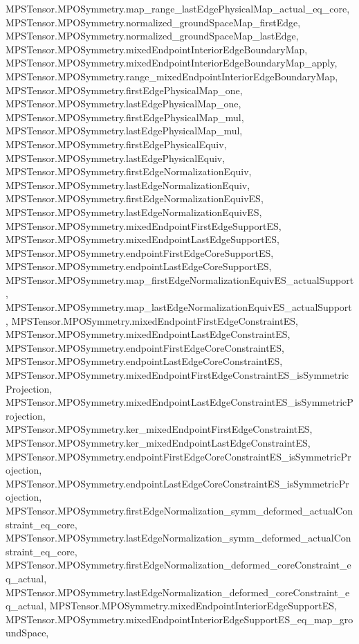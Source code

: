 \begin{lemma}
{        MPSTensor.MPOSymmetry.map_range_lastEdgePhysicalMap_actual_eq_core,
        MPSTensor.MPOSymmetry.normalized_groundSpaceMap_firstEdge,
        MPSTensor.MPOSymmetry.normalized_groundSpaceMap_lastEdge,
        MPSTensor.MPOSymmetry.mixedEndpointInteriorEdgeBoundaryMap,
        MPSTensor.MPOSymmetry.mixedEndpointInteriorEdgeBoundaryMap_apply,
        MPSTensor.MPOSymmetry.range_mixedEndpointInteriorEdgeBoundaryMap,
        MPSTensor.MPOSymmetry.firstEdgePhysicalMap_one,
        MPSTensor.MPOSymmetry.lastEdgePhysicalMap_one,
        MPSTensor.MPOSymmetry.firstEdgePhysicalMap_mul,
        MPSTensor.MPOSymmetry.lastEdgePhysicalMap_mul,
        MPSTensor.MPOSymmetry.firstEdgePhysicalEquiv,
        MPSTensor.MPOSymmetry.lastEdgePhysicalEquiv,
        MPSTensor.MPOSymmetry.firstEdgeNormalizationEquiv,
        MPSTensor.MPOSymmetry.lastEdgeNormalizationEquiv,
        MPSTensor.MPOSymmetry.firstEdgeNormalizationEquivES,
        MPSTensor.MPOSymmetry.lastEdgeNormalizationEquivES,
        MPSTensor.MPOSymmetry.mixedEndpointFirstEdgeSupportES,
        MPSTensor.MPOSymmetry.mixedEndpointLastEdgeSupportES,
        MPSTensor.MPOSymmetry.endpointFirstEdgeCoreSupportES,
        MPSTensor.MPOSymmetry.endpointLastEdgeCoreSupportES,
        MPSTensor.MPOSymmetry.map_firstEdgeNormalizationEquivES_actualSupport,
        MPSTensor.MPOSymmetry.map_lastEdgeNormalizationEquivES_actualSupport,
        MPSTensor.MPOSymmetry.mixedEndpointFirstEdgeConstraintES,
        MPSTensor.MPOSymmetry.mixedEndpointLastEdgeConstraintES,
        MPSTensor.MPOSymmetry.endpointFirstEdgeCoreConstraintES,
        MPSTensor.MPOSymmetry.endpointLastEdgeCoreConstraintES,
        MPSTensor.MPOSymmetry.mixedEndpointFirstEdgeConstraintES_isSymmetricProjection,
        MPSTensor.MPOSymmetry.mixedEndpointLastEdgeConstraintES_isSymmetricProjection,
        MPSTensor.MPOSymmetry.ker_mixedEndpointFirstEdgeConstraintES,
        MPSTensor.MPOSymmetry.ker_mixedEndpointLastEdgeConstraintES,
        MPSTensor.MPOSymmetry.endpointFirstEdgeCoreConstraintES_isSymmetricProjection,
        MPSTensor.MPOSymmetry.endpointLastEdgeCoreConstraintES_isSymmetricProjection,
        MPSTensor.MPOSymmetry.firstEdgeNormalization_symm_deformed_actualConstraint_eq_core,
        MPSTensor.MPOSymmetry.lastEdgeNormalization_symm_deformed_actualConstraint_eq_core,
        MPSTensor.MPOSymmetry.firstEdgeNormalization_deformed_coreConstraint_eq_actual,
        MPSTensor.MPOSymmetry.lastEdgeNormalization_deformed_coreConstraint_eq_actual,
        MPSTensor.MPOSymmetry.mixedEndpointInteriorEdgeSupportES,
        MPSTensor.MPOSymmetry.mixedEndpointInteriorEdgeSupportES_eq_map_groundSpace,
}
\end{lemma}
